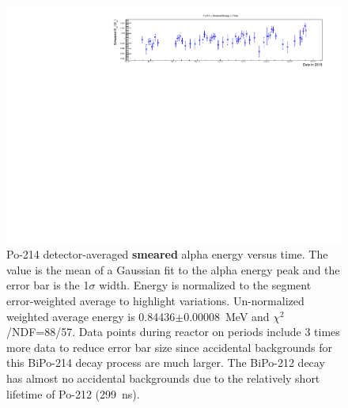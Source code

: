 \begin{figure}[!h]
\centering
\includegraphics[width=1.05\textwidth]{figures/PubBiPo214EsmearvsT.pdf}
\caption{\label{fig:EsmearvsT214}Po-214 detector-averaged {\bf smeared} alpha energy versus time. The value is the mean of a Gaussian fit to the alpha energy peak and the error bar is the 1$\sigma$ width. Energy is normalized to the segment error-weighted average to highlight variations. Un-normalized weighted average energy is 0.84436$\pm$0.00008~MeV and $\chi^2$/NDF=88/57. Data points during reactor on periods include 3 times more data to reduce error bar size since accidental backgrounds for this BiPo-214 decay process are much larger. The BiPo-212 decay has almost no accidental backgrounds due to the relatively short lifetime of Po-212 (299~ns).}
\end{figure}
\FloatBarrier
\newpage
